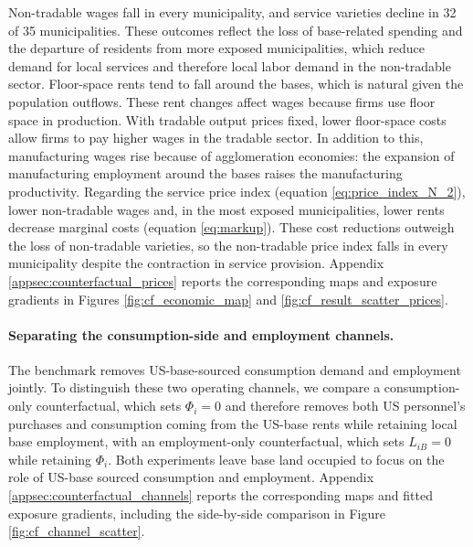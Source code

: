 \documentclass[12pt, unicode, a4paper]{article}
\newcommand{\1}{\mbox{1}\hspace{-0.25em}\mbox{l}} %
\begin{document}
Non-tradable wages fall in every municipality, and service varieties decline in 32 of 35 municipalities. These outcomes reflect the loss of base-related spending and the departure of residents from more exposed municipalities, which reduce demand for local services and therefore local labor demand in the non-tradable sector. 
Floor-space rents tend to fall around the bases, which is natural given the population outflows.
These rent changes affect wages because firms use floor space in production. With tradable output prices fixed, lower floor-space costs allow firms to pay higher wages in the tradable sector. In addition to this, manufacturing wages rise because of agglomeration economies: the expansion of manufacturing employment around the bases raises the manufacturing productivity.
Regarding the service price index (equation \ref{eq:price_index_N_2}), lower non-tradable wages and, in the most exposed municipalities, lower rents decrease marginal costs (equation \ref{eq:markup}). These cost reductions outweigh the loss of non-tradable varieties, so the non-tradable price index falls in every municipality despite the contraction in service provision. Appendix \ref{appsec:counterfactual_prices} reports the corresponding maps and exposure gradients in Figures \ref{fig:cf_economic_map} and \ref{fig:cf_result_scatter_prices}.

\paragraph{Separating the consumption-side and employment channels.}\label{sec:decompose_bases}

The benchmark removes US-base-sourced consumption demand and employment jointly. To distinguish these two operating channels, we compare a consumption-only counterfactual, which sets $\Phi_i=0$ and therefore removes both US personnel's purchases and consumption coming from the US-base rents while retaining local base employment, with an employment-only counterfactual, which sets $L_{iB}=0$ while retaining $\Phi_i$. Both experiments leave base land occupied to focus on the role of US-base sourced consumption and employment. Appendix \ref{appsec:counterfactual_channels} reports the corresponding maps and fitted exposure gradients, including the side-by-side comparison in Figure \ref{fig:cf_channel_scatter}.
\end{document}
